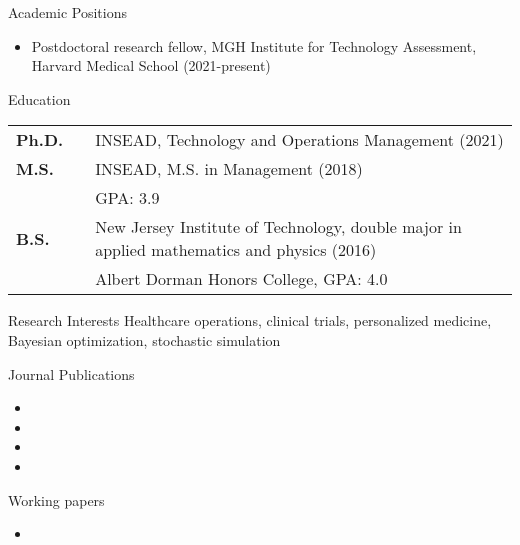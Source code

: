 \documentclass{resume}
\begin{document}


\begin{rSection}{Academic Positions}
  \begin{itemize}
    \item Postdoctoral research fellow, MGH Institute for Technology Assessment, Harvard Medical School (2021-present)
  \end{itemize}
\end{rSection}


\begin{rSection}{Education}

\begin{tabular}{lll}
\textbf{Ph.D.} & & INSEAD, Technology and Operations Management (2021)\\
\textbf{M.S.} & & INSEAD, M.S. in Management (2018)\\
& & GPA: 3.9\\
\textbf{B.S.} & & New Jersey Institute of Technology, double major in applied mathematics and physics (2016)\\
& & Albert Dorman Honors College, GPA: 4.0
\end{tabular}

\end{rSection}

\begin{rSection}{Research Interests}
Healthcare operations, clinical trials, personalized medicine, Bayesian optimization, stochastic simulation%
\end{rSection}

\begin{rSection}{Journal Publications}
\begin{itemize}
\item {}
\item {}
\item {}
\item {}
\end{itemize}
\end{rSection}

\begin{rSection}{Working papers}
\begin{itemize}
\item {}
\end{itemize}
\end{rSection}
\end{document}

